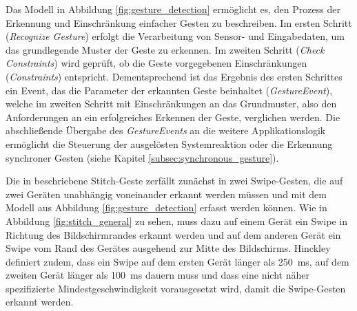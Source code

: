 Das Modell in Abbildung \ref{fig:gesture_detection} ermöglicht es, den Prozess der Erkennung und Einschränkung einfacher Gesten zu beschreiben. Im ersten Schritt (\textit{Recognize Gesture}) erfolgt die Verarbeitung von Sensor- und Eingabedaten, um das grundlegende Muster der Geste zu erkennen. Im zweiten Schritt (\textit{Check Constraints}) wird geprüft, ob die Geste vorgegebenen Einschränkungen (\textit{Constraints}) entspricht. Dementsprechend ist das Ergebnis des ersten Schrittes ein Event, das die Parameter der erkannten Geste beinhaltet (\textit{GestureEvent}), welche im zweiten Schritt mit Einschränkungen an das Grundmuster, also den Anforderungen an ein erfolgreiches Erkennen der Geste, verglichen werden. Die abschließende Übergabe des \textit{GestureEvents} an die weitere Applikationslogik ermöglicht die Steuerung der ausgelösten Systemreaktion oder die Erkennung synchroner Gesten (siehe Kapitel \ref{subsec:synchronous_gesture}).

Die in \citep{Hinckley2004} beschriebene Stitch-Geste zerfällt zunächst in zwei Swipe-Gesten, die auf zwei Geräten unabhängig voneinander erkannt werden müssen und mit dem Modell aus Abbildung \ref{fig:gesture_detection} erfasst werden können. Wie in Abbildung \ref{fig:stitch_general} zu sehen, muss dazu auf einem Gerät ein Swipe in Richtung des Bildschirmrandes erkannt werden und auf dem anderen Gerät ein Swipe vom Rand des Gerätes ausgehend zur Mitte des Bildschirms. Hinckley definiert zudem, dass ein Swipe auf dem ersten Gerät länger als \SI{250}{\milli\second}, auf dem zweiten Gerät länger als \SI{100}{\milli\second} dauern muss und dass eine nicht näher spezifizierte Mindestgeschwindigkeit vorausgesetzt wird, damit die Swipe-Gesten erkannt werden.

